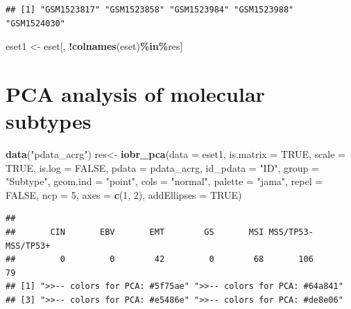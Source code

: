 \documentclass[
  12pt,
]{book}
\newenvironment{Shaded}{\begin{snugshade}}{\end{snugshade}}
\newcommand{\AttributeTok}[1]{\textcolor[rgb]{0.13,0.29,0.53}{#1}}
\newcommand{\ConstantTok}[1]{\textcolor[rgb]{0.56,0.35,0.01}{#1}}
\newcommand{\DecValTok}[1]{\textcolor[rgb]{0.00,0.00,0.81}{#1}}
\newcommand{\FunctionTok}[1]{\textcolor[rgb]{0.13,0.29,0.53}{\textbf{#1}}}
\newcommand{\NormalTok}[1]{#1}
\newcommand{\OtherTok}[1]{\textcolor[rgb]{0.56,0.35,0.01}{#1}}
\newcommand{\SpecialCharTok}[1]{\textcolor[rgb]{0.81,0.36,0.00}{\textbf{#1}}}
\newcommand{\StringTok}[1]{\textcolor[rgb]{0.31,0.60,0.02}{#1}}
\theoremstyle{definition}
\theoremstyle{definition}
\theoremstyle{definition}
\theoremstyle{definition}
\theoremstyle{remark}
\begin{document}
\begin{verbatim}
## [1] "GSM1523817" "GSM1523858" "GSM1523984" "GSM1523988" "GSM1524030"
\end{verbatim}

\begin{Shaded}
\begin{Highlighting}[]
\NormalTok{eset1 }\OtherTok{\textless{}{-}}\NormalTok{ eset[, }\SpecialCharTok{!}\FunctionTok{colnames}\NormalTok{(eset)}\SpecialCharTok{\%in\%}\NormalTok{res]}
\end{Highlighting}
\end{Shaded}

\hypertarget{pca-analysis-of-molecular-subtypes}{%
\section{PCA analysis of molecular subtypes}\label{pca-analysis-of-molecular-subtypes}}

\begin{Shaded}
\begin{Highlighting}[]
\FunctionTok{data}\NormalTok{(}\StringTok{"pdata\_acrg"}\NormalTok{)}
\NormalTok{res}\OtherTok{\textless{}{-}} \FunctionTok{iobr\_pca}\NormalTok{(}\AttributeTok{data       =}\NormalTok{ eset1,}
              \AttributeTok{is.matrix   =} \ConstantTok{TRUE}\NormalTok{,}
              \AttributeTok{scale       =} \ConstantTok{TRUE}\NormalTok{,}
              \AttributeTok{is.log      =} \ConstantTok{FALSE}\NormalTok{,}
              \AttributeTok{pdata       =}\NormalTok{ pdata\_acrg, }
              \AttributeTok{id\_pdata    =} \StringTok{"ID"}\NormalTok{, }
              \AttributeTok{group       =} \StringTok{"Subtype"}\NormalTok{,}
              \AttributeTok{geom.ind    =} \StringTok{"point"}\NormalTok{, }
              \AttributeTok{cols        =} \StringTok{"normal"}\NormalTok{,}
              \AttributeTok{palette     =} \StringTok{"jama"}\NormalTok{, }
              \AttributeTok{repel       =} \ConstantTok{FALSE}\NormalTok{,}
              \AttributeTok{ncp         =} \DecValTok{5}\NormalTok{,}
              \AttributeTok{axes        =} \FunctionTok{c}\NormalTok{(}\DecValTok{1}\NormalTok{, }\DecValTok{2}\NormalTok{),}
              \AttributeTok{addEllipses =} \ConstantTok{TRUE}\NormalTok{)}
\end{Highlighting}
\end{Shaded}

\begin{verbatim}
## 
##       CIN       EBV       EMT        GS       MSI MSS/TP53- MSS/TP53+ 
##         0         0        42         0        68       106        79 
## [1] ">>-- colors for PCA: #5f75ae" ">>-- colors for PCA: #64a841"
## [3] ">>-- colors for PCA: #e5486e" ">>-- colors for PCA: #de8e06"
\end{verbatim}
\end{document}
